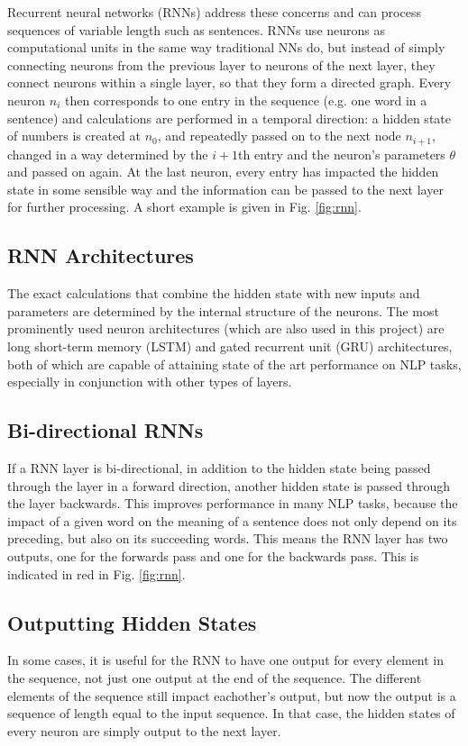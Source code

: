     Recurrent neural networks (RNNs) address these concerns and can process sequences of variable length such as sentences. RNNs use neurons as computational units in the same way traditional NNs do, but instead of simply connecting neurons from the previous layer to neurons of the next layer, they connect neurons within a single layer, so that they form a directed graph. Every neuron $n_i$ then corresponds to one entry in the sequence (e.g. one word in a sentence) and calculations are performed in a temporal direction: a hidden state of numbers is created at $n_0$, and repeatedly passed on to the next node $n_{i+1}$, changed in a way determined by the $i+1$th entry and the neuron's parameters $\theta$ and passed on again. At the last neuron, every entry has impacted the hidden state in some sensible way and the information can be passed to the next layer for further processing. A short example is given in Fig. \ref{fig:rnn}.
    
    \subsection{RNN Architectures \label{ssec: rnn architectures}}
    The exact calculations that combine the hidden state with new inputs and parameters are determined by the internal structure of the neurons. The most prominently used neuron architectures (which are also used in this project) are long short-term memory (LSTM)\cite{hochreiter1997long} and gated recurrent unit (GRU)\cite{chung2014empirical} architectures, both of which are capable of attaining state of the art performance on NLP tasks, especially in conjunction with other types of layers.\cite{huang2015bidirectional}
    
    \subsection{Bi-directional RNNs \label{ssec: bidirectional RNN}}
    If a RNN layer is bi-directional, in addition to the hidden state being passed through the layer in a forward direction, another hidden state is passed through the layer backwards. This improves performance in many NLP tasks, because the impact of a given word on the meaning of a sentence does not only depend on its preceding, but also on its succeeding words. This means the RNN layer has two outputs, one for the forwards pass and one for the backwards pass. This is indicated in red in Fig. \ref{fig:rnn}.
    
    \subsection{Outputting Hidden States \label{ssec: outputting hidden states}}
    In some cases, it is useful for the RNN to have one output for every element in the sequence, not just one output at the end of the sequence. The different elements of the sequence still impact eachother's output, but now the output is a sequence of length equal to the input sequence. In that case, the hidden states of every neuron are simply output to the next layer.  
    
